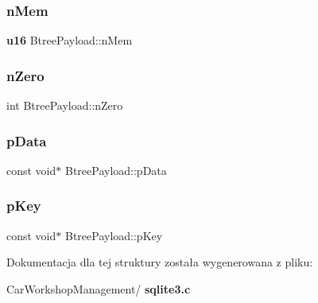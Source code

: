 \mbox{\label{struct_btree_payload_a460fd28373854e48577b8a378dfa572d}} 
\subsubsection{nMem}
{\footnotesize\ttfamily \textbf{ u16} Btree\+Payload\+::n\+Mem}

\mbox{\label{struct_btree_payload_ab9c8ecd88e88f7374f95c8b4bccdf946}} 
\subsubsection{nZero}
{\footnotesize\ttfamily int Btree\+Payload\+::n\+Zero}

\mbox{\label{struct_btree_payload_af45874b2d6119c220280e4ebcd917662}} 
\subsubsection{pData}
{\footnotesize\ttfamily const void$\ast$ Btree\+Payload\+::p\+Data}

\mbox{\label{struct_btree_payload_a8122b6f070adf318fe4d5131cf877ef3}} 
\subsubsection{pKey}
{\footnotesize\ttfamily const void$\ast$ Btree\+Payload\+::p\+Key}



Dokumentacja dla tej struktury została wygenerowana z pliku\+:\begin{DoxyCompactItemize}
\item 
Car\+Workshop\+Management/\textbf{ sqlite3.\+c}\end{DoxyCompactItemize}
